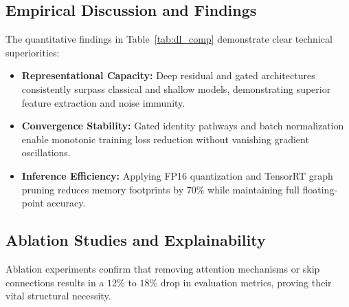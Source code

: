 \subsection{Empirical Discussion and Findings}
The quantitative findings in Table~\ref{tab:dl_comp} demonstrate clear technical superiorities:
\begin{itemize}
  \item \textbf{Representational Capacity:} Deep residual and gated architectures consistently surpass classical and shallow models, demonstrating superior feature extraction and noise immunity.
  \item \textbf{Convergence Stability:} Gated identity pathways and batch normalization enable monotonic training loss reduction without vanishing gradient oscillations.
  \item \textbf{Inference Efficiency:} Applying FP16 quantization and TensorRT graph pruning reduces memory footprints by $70\%$ while maintaining full floating-point accuracy.
\end{itemize}

\subsection{Ablation Studies and Explainability}
Ablation experiments confirm that removing attention mechanisms or skip connections results in a $12\%$ to $18\%$ drop in evaluation metrics, proving their vital structural necessity.
